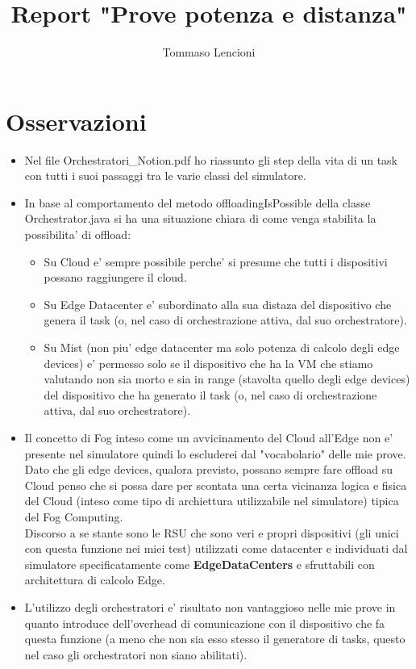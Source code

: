 \documentclass[12pt, a4paper]{report} %
\title{Report "Prove potenza e distanza"}
\author{Tommaso Lencioni}
\begin{document}
\maketitle
\section*{Osservazioni}
 \begin{itemize}
 	\item Nel file Orchestratori\_Notion.pdf ho riassunto gli step della vita di un task con tutti i suoi passaggi tra le varie classi del simulatore.
 	\item In base al comportamento del metodo offloadingIsPossible della classe Orchestrator.java si ha una situazione chiara di come venga stabilita la possibilita' di offload:
 	\begin{itemize}
 		\item Su Cloud e' sempre possibile perche' si presume che tutti i dispositivi possano raggiungere il cloud.
 		\item Su Edge Datacenter e' subordinato alla sua distaza del dispositivo che genera il task (o, nel caso di orchestrazione attiva, dal suo orchestratore).
 		\item Su Mist (non piu' edge datacenter ma solo potenza di calcolo degli edge devices) e' permesso solo se il dispositivo che ha la VM che stiamo valutando non sia morto e sia in range (stavolta quello degli edge devices) del dispositivo che ha generato il task (o, nel caso di orchestrazione attiva, dal suo orchestratore).
 	\end{itemize}
 	\item Il concetto di Fog inteso come un avvicinamento del Cloud all'Edge non e' presente nel simulatore quindi lo escluderei dal "vocabolario" delle mie prove.
 	Dato che gli edge devices, qualora previsto, possano sempre fare offload su Cloud penso che si possa dare per scontata una certa vicinanza logica e fisica del Cloud (inteso come tipo di archiettura utilizzabile nel simulatore) tipica del Fog Computing.\\
 	Discorso a se stante sono le RSU che sono veri e propri dispositivi (gli unici con questa funzione nei miei test) utilizzati come datacenter e individuati dal simulatore specificatamente come \textbf{EdgeDataCenters} e sfruttabili con architettura di calcolo Edge.
 	\item L'utilizzo degli orchestratori e' risultato non vantaggioso nelle mie prove in quanto introduce dell'overhead di comunicazione con il dispositivo che fa questa funzione (a meno che non sia esso stesso il generatore di tasks, questo nel caso gli orchestratori non siano abilitati).\\

\end{itemize}
\end{document}
